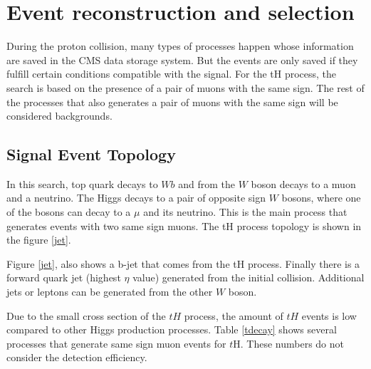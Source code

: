 \chapter{Event reconstruction and selection}
During the proton collision, many types of processes happen whose information are saved in the CMS data storage system. But the events are only saved if they fulfill certain conditions compatible with the signal. 
For the tH process, the search is based on the presence of a pair of muons with the same sign. The rest of the processes that also generates a pair of muons with the same sign will be considered backgrounds. 
\section{Signal Event Topology} 
In this search, top quark decays to $Wb$ and from the $W$ boson decays to a muon and a neutrino. The Higgs decays to a pair of opposite sign $W$ bosons, where one of the bosons can decay to a $\mu$ and its neutrino. This is the main process that generates events with two same sign muons. The tH process topology is shown in the figure \ref{jet}.

Figure \ref{jet}, also shows a b-jet that comes from the tH process. Finally there is a forward quark jet (highest $\eta$ value) generated from the initial collision. Additional jets or leptons can be generated from the other $W$ boson.
	
Due to the small cross section of the $tH$ process, the amount of $tH$ events is low compared to other Higgs production processes. 
Table \ref{tdecay} shows several processes that generate same sign muon events for $t$H. These numbers do not consider the detection efficiency.
\pagebreak

